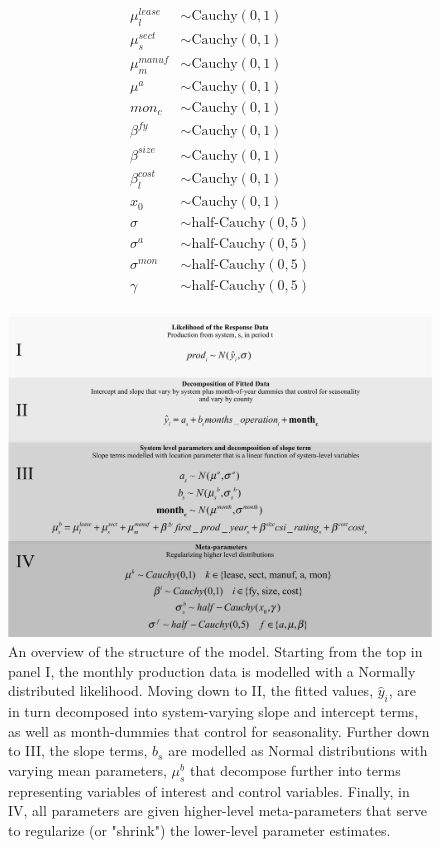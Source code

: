 \documentclass[a4paper]{article}
\begin{document}
\begin{equation}
\begin{aligned}
\mu^{lease}_l &\sim \text{Cauchy}(0,1) \\
\mu^{sect}_s &\sim \text{Cauchy}(0,1) \\
\mu^{manuf}_m &\sim \text{Cauchy}(0,1) \label{eqn:meta} \\
\mu^{a} &\sim \text{Cauchy}(0,1) \\
mon_c &\sim \text{Cauchy}(0,1) \\
\beta^{fy} &\sim \text{Cauchy}(0,1) \\
\beta^{size} &\sim \text{Cauchy}(0,1)\\
\beta_l^{cost} &\sim \text{Cauchy}(0,1)\\
x_0 &\sim \text{Cauchy}(0,1)\\
\sigma &\sim \text{half-Cauchy}(0,5) \\
\sigma^{a} &\sim \text{half-Cauchy}(0,5) \\
\sigma^{mon} &\sim \text{half-Cauchy}(0,5) \\
\gamma &\sim \text{half-Cauchy}(0,5)\\
\end{aligned}
\end{equation}

\begin{figure}
  \centering
	\includegraphics[width=1\textwidth]{figures/solar_prod_hierarchy.png}
	\caption{An overview of the structure of the model. Starting from the top in panel I, the monthly production data is modelled with a Normally distributed likelihood. Moving down to II, the fitted values, $\hat{y}_{i}$, are in turn decomposed into system-varying slope and intercept terms, as well as month-dummies that control for seasonality. Further down to III, the slope terms, $b_s$ are modelled as Normal distributions with varying mean parameters, $\mu_s^b$ that decompose further into terms representing variables of interest and control variables. Finally, in IV, all parameters are given higher-level meta-parameters that serve to regularize (or "shrink") the lower-level parameter estimates. \label{solar_prod_hierarchy}}

\end{figure}
\end{document}
